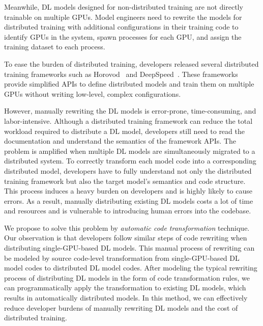 Meanwhile, DL models designed for non-distributed training are not directly
trainable on multiple GPUs.
Model engineers need to rewrite the models for distributed training
with additional configurations in their training code to identify GPUs in the
system, spawn processes for each GPU, and assign the training dataset to each
process.
\begin{inred}
To ease the burden of distributed training, developers released
several distributed training frameworks such as 
Horovod~\cite{sergeev2018horovod} and DeepSpeed~\cite{deepspeed}. 
These frameworks provide simplified APIs to define distributed models
and train them on multiple GPUs without writing low-level, complex configurations. 
\end{inred}

\begin{inred}
However, manually rewriting the DL models is error-prone, time-consuming, and labor-intensive.
Although a distributed training framework can reduce the total workload required to
distribute a DL model, developers still need to read the documentation and
understand the semantics of the framework APIs. 
The problem is amplified when multiple DL models are simultaneously migrated to a distributed system.
To correctly transform each model code into a corresponding distributed model,
developers have to fully understand not only the distributed training framework
but also the target model's semantics and code structure.
This process induces a heavy burden on developers and is highly likely to cause errors.
As a result, manually distributing existing DL models costs a lot of time and resources
and is vulnerable to introducing human errors into the codebase.



We propose to solve this problem by \textit{automatic code transformation} technique.
Our observation is that developers follow similar steps of code rewriting
when distributing single-GPU-based DL models. 
This manual process of rewriting can be modeled by
source code-level transformation from single-GPU-based DL model codes
to distributed DL model codes.
After modeling the typical rewriting process of distributing DL models 
in the form of code transformation rules, 
we can programmatically apply the transformation to existing DL models,
which results in automatically distributed models.
In this method, we can effectively reduce developer burdens of
manually rewriting DL models and the cost of distributed training.
 
\end{inred}

